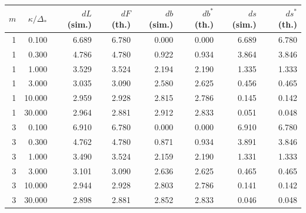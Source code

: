 \begin{tabular}{rrrrrrrr}
\toprule
$m$ & $\kappa/\Delta_\ast$ & $dL$ (sim.) & $dF$ (th.) & $db$ (sim.) & $db^\ast$ (th.) & $ds$ (sim.) & $ds^\ast$ (th.) \\
\midrule
1 & 0.100 & 6.689 & 6.780 & 0.000 & 0.000 & 6.689 & 6.780 \\
1 & 0.300 & 4.786 & 4.780 & 0.922 & 0.934 & 3.864 & 3.846 \\
1 & 1.000 & 3.529 & 3.524 & 2.194 & 2.190 & 1.335 & 1.333 \\
1 & 3.000 & 3.035 & 3.090 & 2.580 & 2.625 & 0.456 & 0.465 \\
1 & 10.000 & 2.959 & 2.928 & 2.815 & 2.786 & 0.145 & 0.142 \\
1 & 30.000 & 2.964 & 2.881 & 2.912 & 2.833 & 0.051 & 0.048 \\
3 & 0.100 & 6.910 & 6.780 & 0.000 & 0.000 & 6.910 & 6.780 \\
3 & 0.300 & 4.762 & 4.780 & 0.871 & 0.934 & 3.891 & 3.846 \\
3 & 1.000 & 3.490 & 3.524 & 2.159 & 2.190 & 1.331 & 1.333 \\
3 & 3.000 & 3.101 & 3.090 & 2.636 & 2.625 & 0.465 & 0.465 \\
3 & 10.000 & 2.944 & 2.928 & 2.803 & 2.786 & 0.141 & 0.142 \\
3 & 30.000 & 2.898 & 2.881 & 2.852 & 2.833 & 0.046 & 0.048 \\
\bottomrule
\end{tabular}
